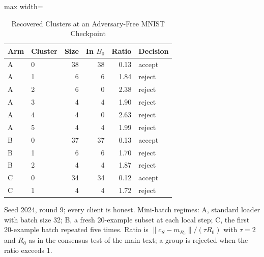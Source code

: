 \begin{table}[!t]
\centering\footnotesize
\setlength{\tabcolsep}{4pt}
\caption{Recovered Clusters at an Adversary-Free MNIST Checkpoint}\label{tab:cluster_ratios}
\begin{adjustbox}{max width=\columnwidth}
\begin{tabular}{llrrrl}
\toprule
Arm & Cluster & Size & In $B_0$ & Ratio & Decision \\
\midrule
A & 0 & 38 & 38 & 0.13 & accept \\
A & 1 & 6 & 6 & 1.84 & reject \\
A & 2 & 6 & 0 & 2.38 & reject \\
A & 3 & 4 & 4 & 1.90 & reject \\
A & 4 & 4 & 0 & 2.63 & reject \\
A & 5 & 4 & 4 & 1.99 & reject \\
B & 0 & 37 & 37 & 0.13 & accept \\
B & 1 & 6 & 6 & 1.70 & reject \\
B & 2 & 4 & 4 & 1.87 & reject \\
C & 0 & 34 & 34 & 0.12 & accept \\
C & 1 & 4 & 4 & 1.72 & reject \\
\bottomrule
\end{tabular}
\end{adjustbox}

\par\vspace{3pt}\parbox{\linewidth}{\footnotesize Seed 2024, round 9; every client is honest. Mini-batch regimes: A, standard loader with batch size 32; B, a fresh 20-example subset at each local step; C, the first 20-example batch repeated five times. Ratio is $\lVert c_S-m_{B_0}\rVert/(\tau R_0)$ with $\tau=2$ and $R_0$ as in the consensus test of the main text; a group is rejected when the ratio exceeds 1.}
\end{table}
